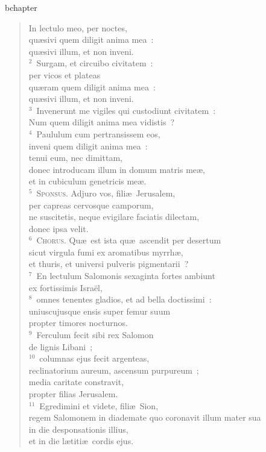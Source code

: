 bchapter\begin{verse}\vspace{-19pt}In lectulo meo, per noctes,\\ qu\ae sivi quem diligit anima mea~:\\ qu\ae sivi illum, et non inveni.\\
${}^{2}$~Surgam, et circuibo civitatem~:\\ per vicos et plateas\\ qu\ae ram quem diligit anima mea~:\\ qu\ae sivi illum, et non inveni.\\
${}^{3}$~Invenerunt me vigiles qui custodiunt civitatem~:\\ Num quem diligit anima mea vidistis~?\\
${}^{4}$~Paululum cum pertransissem eos,\\ inveni quem diligit anima mea~:\\ tenui eum, nec dimittam,\\ donec introducam illum in domum matris me\ae ,\\ et in cubiculum genetricis me\ae .\\
${}^{5}$~\textsc{Sponsus.} Adjuro vos, fili\ae\ Jerusalem,\\ per capreas cervosque camporum,\\ ne suscitetis, neque evigilare faciatis dilectam,\\ donec ipsa velit.\\
${}^{6}$~\textsc{Chorus.} Qu\ae\ est ista qu\ae\ ascendit per desertum\\ sicut virgula fumi ex aromatibus myrrh\ae ,\\ et thuris, et universi pulveris pigmentarii~?\\
${}^{7}$~En lectulum Salomonis sexaginta fortes ambiunt\\ ex fortissimis Isra\"el,\\
${}^{8}$~omnes tenentes gladios, et ad bella doctissimi~:\\ uniuscujusque ensis super femur suum\\ propter timores nocturnos.\\
${}^{9}$~Ferculum fecit sibi rex Salomon\\ de lignis Libani~;\\
${}^{10}$~columnas ejus fecit argenteas,\\ reclinatorium aureum, ascensum purpureum~;\\ media caritate constravit,\\ propter filias Jerusalem.\\
${}^{11}$~Egredimini et videte, fili\ae\ Sion,\\ regem Salomonem in diademate quo coronavit illum mater sua\\ in die desponsationis illius,\\ et in die l\ae titi\ae\ cordis ejus.\end{verse}


